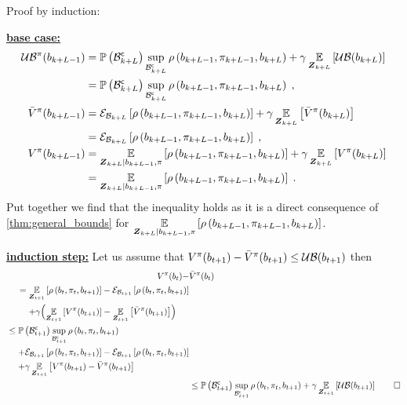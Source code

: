 \begin{proofE}
	Proof by induction:

	\textbf{\underline{base case:}}
	\begin{align*}
		\upperbound\nolimits^\pi(\blf{k+L-1})&=\measure{\stcompI{\subSpace}{k+L}}\sup_{\stcompI{\subSpace}{k+L}}\reward{\blf{k+L-1},\pi_{k+L-1},\blf{k+L}}+\gamma\expectation{\upperbound(\blf{k+L})}{\observationsRV{k+L}}\\
		&=\measure{\stcompI{\subSpace}{k+L}}\sup_{\stcompI{\subSpace}{k+L}}\reward{\blf{k+L-1},\pi_{k+L-1},\blf{k+L}}\;,\\
		\bar{V}^\pi(\blf{k+L-1})&=\partialexpectation{\reward{\blf{k+L-1},\pi_{k+L-1},\blf{k+L}}}{\subSpaceI{k+L}}+\gamma\expectation{\bar{V}^\pi(\blf{k+L})}{\observationsRV{k+L}}\\
		&=\partialexpectation{\reward{\blf{k+L-1},\pi_{k+L-1},\blf{k+L}}}{\subSpaceI{k+L}}\;,\\
		V^\pi(\blf{k+L-1})&=\expectation{\reward{\blf{k+L-1},\pi_{k+L-1},\blf{k+L}}}{\observationsRV{k+L}\mid\blf{k+L-1},\pi}+\gamma\expectation{V^\pi(\blf{k+L})}{\observationsRV{k+L}}\\
		&=\expectation{\reward{\blf{k+L-1},\pi_{k+L-1},\blf{k+L}}}{\observationsRV{k+L}\mid\blf{k+L-1},\pi}\;.
	\end{align*}
	Put together we find that the inequality holds as it is a direct consequence of \cref{thm:general_bounds} for $\expectation{\reward{\blf{k+L-1},\pi_{k+L-1},\blf{k+L}}}{\observationsRV{k+L}\mid\blf{k+L-1},\pi}$.

	\textbf{\underline{induction step:}}
	Let us assume that $V^\pi(\blf{t+1})-\bar{V}^\pi(\blf{t+1})\leq\upperbound(\blf{t+1})$ then
	\begin{align*}
		V^\pi(\blf{t})-&\bar{V}^\pi(\blf{t})\\
		\begin{split}
			&=\expectation{\reward{\blf{t},\pi_t,\blf{t+1}}}{\observationsRV{t+1}}-\partialexpectation{\reward{\blf{t},\pi_t,\blf{t+1}}}{\subSpaceI{t+1}}\\
			&\phantomeq+\gamma\Bigl(\expectation{V^\pi(\blf{t+1})}{\observationsRV{t+1}}-\expectation{\bar{V}^\pi(\blf{t+1})}{\observationsRV{t+1}}\Bigr)
		\end{split}\\
		\begin{split}
			&\leq\measure{\stcompI{\subSpace}{t+1}}\sup_{\stcompI{\subSpace}{t+1}}\reward{\blf{t},\pi_t,\blf{t+1}}\\
			&\phantomeq+\partialexpectation{\reward{\blf{t},\pi_t,\blf{t+1}}}{\subSpaceI{t+1}}-\partialexpectation{\reward{\blf{t},\pi_t,\blf{t+1}}}{\subSpaceI{t+1}}\\
			&\phantomeq+\gamma\expectation{V^\pi(\blf{t+1})-\bar{V}^\pi(\blf{t+1})}{\observationsRV{t+1}}
		\end{split}\\
		&\leq\measure{\stcompI{\subSpace}{t+1}}\sup_{\stcompI{\subSpace}{t+1}}\reward{\blf{t},\pi_t,\blf{t+1}}+\gamma\expectation{\upperbound(\blf{t+1})}{\observationsRV{t+1}}\qed
	\end{align*}
\end{proofE}

